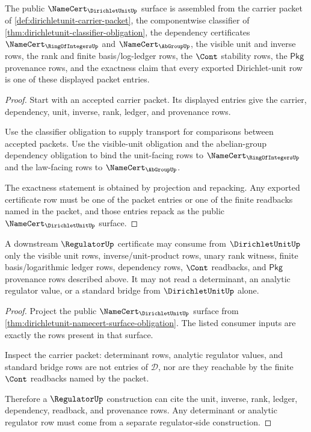\begin{theorem}
\label{thm:dirichletunit-namecert-surface-obligation}
The public $\NameCert_{\DirichletUnitUp}$ surface is assembled from the carrier packet of \autoref{def:dirichletunit-carrier-packet}, the componentwise classifier of \autoref{thm:dirichletunit-classifier-obligation}, the dependency certificates $\NameCert_{\RingOfIntegersUp}$ and $\NameCert_{\AbGroupUp}$, the visible unit and inverse rows, the rank and finite basis/log-ledger rows, the $\Cont$ stability rows, the $\mathsf{Pkg}$ provenance rows, and the exactness claim that every exported Dirichlet-unit row is one of these displayed packet entries.
\end{theorem}
\begin{proof}
Start with an accepted carrier packet. Its displayed entries give the carrier, dependency, unit, inverse, rank, ledger, and provenance rows.

Use the classifier obligation to supply transport for comparisons between accepted packets. Use the visible-unit obligation and the abelian-group dependency obligation to bind the unit-facing rows to $\NameCert_{\RingOfIntegersUp}$ and the law-facing rows to $\NameCert_{\AbGroupUp}$.

The exactness statement is obtained by projection and repacking. Any exported certificate row must be one of the packet entries or one of the finite readbacks named in the packet, and those entries repack as the public $\NameCert_{\DirichletUnitUp}$ surface.
\end{proof}

\begin{theorem}
\label{thm:dirichletunit-regulator-consumer-boundary}
A downstream $\RegulatorUp$ certificate may consume from $\DirichletUnitUp$ only the visible unit rows, inverse/unit-product rows, unary rank witness, finite basis/logarithmic ledger rows, dependency rows, $\Cont$ readbacks, and $\mathsf{Pkg}$ provenance rows described above. It may not read a determinant, an analytic regulator value, or a standard bridge from $\DirichletUnitUp$ alone.
\end{theorem}
\begin{proof}
Project the public $\NameCert_{\DirichletUnitUp}$ surface from \autoref{thm:dirichletunit-namecert-surface-obligation}. The listed consumer inputs are exactly the rows present in that surface.

Inspect the carrier packet: determinant rows, analytic regulator values, and standard bridge rows are not entries of $\mathcal{D}$, nor are they reachable by the finite $\Cont$ readbacks named by the packet.

Therefore a $\RegulatorUp$ construction can cite the unit, inverse, rank, ledger, dependency, readback, and provenance rows. Any determinant or analytic regulator row must come from a separate regulator-side construction.
\end{proof}

